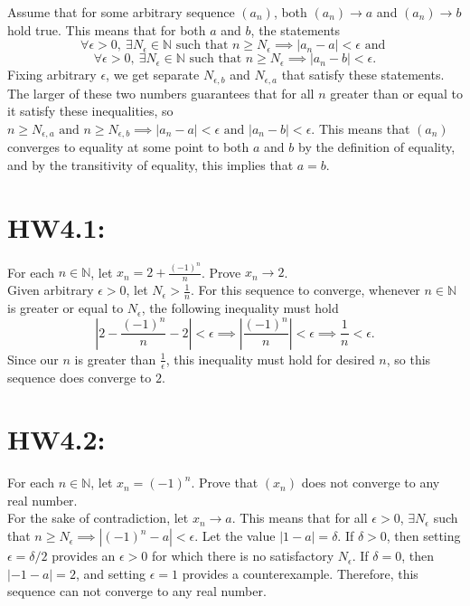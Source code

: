 \documentclass[12pt,letterpaper]{article}
\begin{document}
Assume that for some arbitrary sequence \((a_{n})\), both \((a_{n}) \to a\) and \((a_{n}) \to b\) hold true. This means that for both \(a\) and \(b\), the statements \[\forall \epsilon > 0,\ \exists N_{\epsilon} \in \mathbb{N} \text{ such that } n \geq N_{\epsilon} \implies \left| a_{n} - a \right| < \epsilon \text{ and }\] \[\forall \epsilon > 0,\ \exists N_{\epsilon} \in \mathbb{N} \text{ such that } n \geq N_{\epsilon} \implies \left| a_{n} - b \right| < \epsilon.\] Fixing arbitrary \(\epsilon\), we get separate \(N_{\epsilon,b}\) and \(N_{\epsilon,a}\) that satisfy these statements. The larger of these two numbers guarantees that for all \(n\) greater than or equal to it satisfy these inequalities, so \(n \geq N_{\epsilon,a} \text{ and } n \geq N_{\epsilon,b} \implies \left|a_{n} - a\right| < \epsilon \text{ and } \left| a_{n} - b \right| < \epsilon\). This means that \((a_{n})\) converges to equality at some point to both \(a\) and \(b\) by the definition of equality, and by the transitivity of equality, this implies that \(a = b\).

\section*{HW4.1:}
For each \(n \in \mathbb{N}\), let \(x_{n} = 2 + \frac{(-1)^{n}}{n}\). Prove \(x_{n} \to 2\). \\

Given arbitrary \(\epsilon > 0\), let \(N_{\epsilon} > \frac{1}{n}\). For this sequence to converge, whenever \(n \in \mathbb{N}\) is greater or equal to \(N_{\epsilon}\), the following inequality must hold \[\left| 2 - \frac{(-1)^{n}}{n} - 2 \right| < \epsilon \implies \left| \frac{(-1)^{n}}{n} \right| < \epsilon \implies \frac{1}{n} < \epsilon.\] Since our \(n\) is greater than \(\frac{1}{\epsilon}\), this inequality must hold for desired \(n\), so this sequence does converge to \(2\).

\section*{HW4.2:}
For each \(n \in \mathbb{N}\), let \(x_{n} = (-1)^{n}\). Prove that \((x_{n})\) does not converge to any real number. \\

For the sake of contradiction, let \(x_{n} \to a\). This means that for all \(\epsilon > 0\), \(\exists N_{\epsilon}\) such that \(n \geq N_{\epsilon} \implies \left| (-1)^{n} - a \right| < \epsilon\). Let the value \(\left| 1 - a \right| = \delta\). If \(\delta > 0\), then setting \(\epsilon = \delta/2\) provides an \(\epsilon > 0\) for which there is no satisfactory \(N_{\epsilon}\). If \(\delta = 0\), then \(\left| -1 - a \right| = 2\), and setting \(\epsilon = 1\) provides a counterexample. Therefore, this sequence can not converge to any real number.
\end{document}
